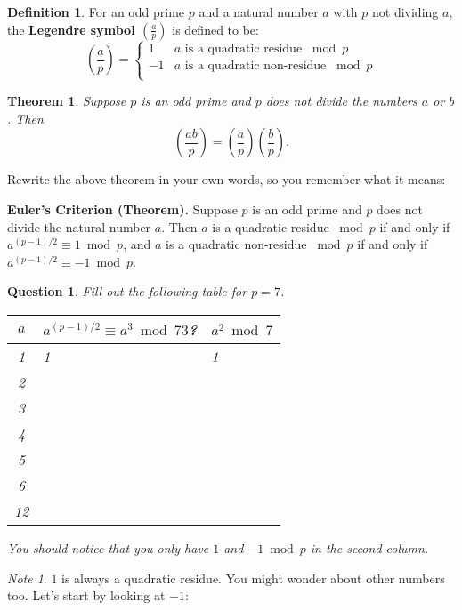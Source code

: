\documentclass[12pt]{amsart}
\theoremstyle{plain}
\newtheorem{thm}{Theorem}
\newtheorem{quest}{Question}
\theoremstyle{definition}
\newtheorem*{defn}{Definition}
\theoremstyle{remark}
\newtheorem*{note}{Note}
\begin{document}
\begin{defn} For an odd prime $p$ and a natural number $a$ with $p$ not dividing $a$, the \textbf{Legendre symbol $\left( \frac{a}{p}\right)$} is defined to be:
\[ \left( \frac{a}{p}\right) = \begin{cases} 
      1 & a \text{ is a quadratic residue } \bmod p \\
      -1 & a \text{ is a quadratic non-residue } \bmod p \\
   \end{cases}
\]
\end{defn}

\begin{thm}
Suppose $p$ is an odd prime and $p$ does not divide the numbers $a$ or $b$.  Then $$\left( \frac{ab}{p}\right) = \left( \frac{a}{p}\right)\left( \frac{b}{p}\right).$$
\end{thm}

Rewrite the above theorem in your own words, so you remember what it means:\\ \vspace{1in}

\noindent \textbf{Euler's Criterion (Theorem).}
Suppose $p$ is an odd prime and $p$ does not divide the natural number $a$.  Then $a$ is a quadratic residue $\bmod p$ if and only if $a^{(p-1)/2} \equiv 1 \bmod p$, and $a$ is a quadratic non-residue $\bmod p$ if and only if $a^{(p-1)/2} \equiv -1 \bmod p$.

\newpage \begin{quest} 
Fill out the following table for $p = 7$.
\begin{center}
\begin{tabular}{|c|p{2in}|p{2in}|} \hline
$a$ & $a^{(p-1)/2} \equiv a^3 \bmod 73$? & $a^2 \bmod 7$\\ \hline
1&1&1\\ [.2in]
2&&\\ [.2in]
3&&\\ [.2in]
4&&\\ [.2in]
5&&\\ [.2in]
6&&\\ [.2in]
12&&\\  [.2in]\hline
\end{tabular}
\end{center}
You should notice that you only have $1$ and $-1 \bmod p$ in the second column.
\end{quest}

\begin{note}
$1$ is always a quadratic residue.  You might wonder about other numbers too.  Let's start by looking at $-1$:
\end{note}
\end{document}
